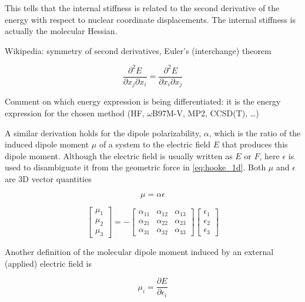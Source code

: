\documentclass[%
class = book,%
crop = false,%
float = true,%
multi = true,%
preview = false,%
]{standalone}
\begin{document}
This tells that the internal stiffness is related to the second derivative of the energy with respect to nuclear coordinate displacements. The internal stiffness is actually the molecular Hessian.

Wikipedia: symmetry of second derivatives, Euler's (interchange) theorem

\begin{equation}
  \frac{\partial^{2} E}{\partial x_{j} \partial x_{i}} = \frac{\partial^{2} E}{\partial x_{i} \partial x_{j}}
\end{equation}

Comment on which energy expression is being differentiated: it is the energy expression for the chosen method (HF, \(\omega\)B97M-V, MP2, CCSD(T), \dots)

A similar derivation holds for the dipole polarizability, \(\alpha\), which is the ratio of the induced dipole moment \(\mu\) of a system to the electric field \(E\) that produces this dipole moment. Although the electric field is usually written as \(E\) or \(F\), here \(\epsilon\) is used to disambiguate it from the geometric force in \eqref{eq:hooke_1d}. Both \(\mu\) and \(\epsilon\) are 3D vector quantities

\begin{equation}
  \mu = \alpha \epsilon
\end{equation}

\begin{equation}
  \begin{bmatrix}
    \mu_{1} \\ \mu_{2} \\ \mu_{3}
  \end{bmatrix}
  = -
  \begin{bmatrix}
    \alpha_{11} & \alpha_{12} & \alpha_{13} \\
    \alpha_{21} & \alpha_{22} & \alpha_{23} \\
    \alpha_{31} & \alpha_{32} & \alpha_{33}
  \end{bmatrix}
  \begin{bmatrix}
    \epsilon_{1} \\ \epsilon_{2} \\ \epsilon_{3}
  \end{bmatrix}
\end{equation}

Another definition of the molecular dipole moment induced by an external (applied) electric field is

\begin{equation}
  \mu_{i} = \frac{\partial E}{\partial \epsilon_{i}}
\end{equation}
\end{document}
